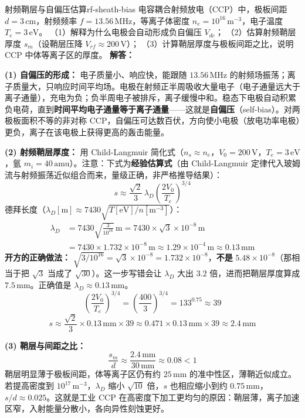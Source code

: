 
\begin{example}{射频鞘层与自偏压估算}{rf-sheath-bias}
电容耦合射频放电（CCP）中，极板间距 $d = 3\,\mathrm{cm}$，射频频率 $f = 13.56\,\mathrm{MHz}$，等离子体密度 $n_e = 10^{16}\,\mathrm{m^{-3}}$，电子温度 $T_e = 3\,\mathrm{eV}$。
（1）解释为什么电极会自动形成负自偏压 $V_{dc}$；
（2）估算射频鞘层厚度 $s_m$（设鞘层压降 $V_{rf}\approx 200\,\mathrm{V}$）；
（3）计算鞘层厚度与极板间距之比，说明 CCP 中体等离子区的厚度。
\tcblower
\textbf{解答：}

\textbf{(1) 自偏压的形成：} 电子质量小、响应快，能跟随 $13.56\,\mathrm{MHz}$ 的射频场振荡；离子质量大，只响应时间平均场。电极在射频正半周吸收大量电子（电子通量远大于离子通量），充电为负；负半周电子被排斥，离子缓慢中和。稳态下电极自动积累负电荷，直到\textbf{时间平均电子通量等于离子通量}——这就是\textbf{自偏压}（self-bias）。对两极板面积不等的非对称 CCP，自偏压可达数百伏，方向使小电极（放电功率电极）更负，离子在该电极上获得更高的轰击能量。

\textbf{(2) 射频鞘层厚度：} 用 Child-Langmuir 简化式（$n_s\approx n_e$，$V_0 = 200\,\mathrm{V}$，$T_e = 3\,\mathrm{eV}$，氩 $m_i = 40\,\mathrm{amu}$）。注意：下式为\textbf{经验估算式}（由 Child-Langmuir 定律代入玻姆流与射频振荡近似组合而来，量级正确，非严格推导结果）：
\[
s \approx \frac{\sqrt{2}}{3}\,\lambda_D\left(\frac{2V_0}{T_e}\right)^{3/4}
\]
德拜长度（$\lambda_D[\mathrm{m}]\approx7430\sqrt{T[\mathrm{eV}]/n[\mathrm{m^{-3}}]}$）：
\begin{align*}
\lambda_D &= 7430\sqrt{\frac{3}{10^{16}}}\,\mathrm{m}
= 7430\times\sqrt{3}\times10^{-8}\,\mathrm{m} \\
&= 7430\times1.732\times10^{-8}\,\mathrm{m}
\approx 1.29\times10^{-4}\,\mathrm{m} \approx 0.13\,\mathrm{mm}
\end{align*}
\textbf{开方的正确做法：} $\sqrt{3/10^{16}}=\sqrt3\times10^{-8}=1.732\times10^{-8}$，\textbf{不是} $5.48\times10^{-8}$（那相当于把 $\sqrt3$ 当成了 $\sqrt{30}$）。这一步写错会让 $\lambda_D$ 大出 $3.2$ 倍，进而把鞘层厚度算成 $7.5\,\mathrm{mm}$。正确值是 $\lambda_D\approx0.13\,\mathrm{mm}$。
\[
\left(\frac{2V_0}{T_e}\right)^{3/4} = \left(\frac{400}{3}\right)^{3/4} = 133^{0.75} \approx 39
\]
\[
s \approx \frac{\sqrt2}{3}\times0.13\,\mathrm{mm}\times39
\approx 0.471\times0.13\,\mathrm{mm}\times39 \approx 2.4\,\mathrm{mm}
\]

\textbf{(3) 鞘层与间距之比：}
\[
\frac{s_m}{d} \approx \frac{2.4\,\mathrm{mm}}{30\,\mathrm{mm}} \approx 0.08 < 1
\]
鞘层明显薄于极板间距，体等离子区仍有约 $25\,\mathrm{mm}$ 的准中性区，薄鞘近似成立。若提高密度到 $10^{17}\,\mathrm{m^{-3}}$，$\lambda_D$ 缩小 $\sqrt{10}$ 倍，$s$ 也相应缩小到约 $0.75\,\mathrm{mm}$，$s/d\approx0.025$。这就是工业 CCP 在高密度下加工更均匀的原因：鞘层薄，离子加速区窄，入射能量分散小，各向异性刻蚀更好。


\end{example}
